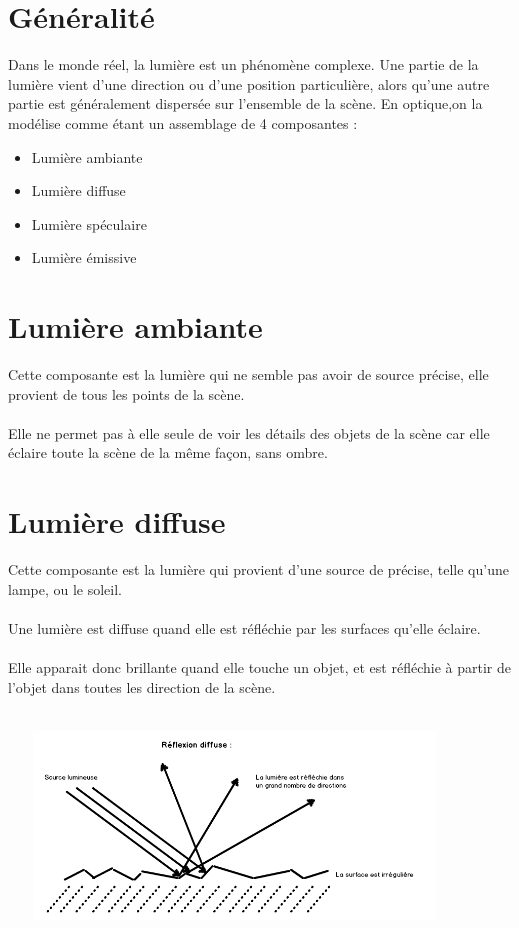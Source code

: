 \section{Généralité}
Dans le monde réel, la lumière est un phénomène complexe.
Une partie de la lumière vient d’une direction ou d’une position particulière, alors
qu’une autre partie est généralement dispersée sur l’ensemble de la scène. En optique,on la modélise comme étant un assemblage de 4 composantes :
\begin{itemize}
\item Lumière ambiante
\item Lumière diffuse
\item Lumière spéculaire
\item Lumière émissive
\end{itemize}

\section{Lumière ambiante}
Cette composante est la lumière qui ne semble pas avoir de source précise, elle provient de tous les points de la scène.
\\\\
Elle ne permet pas à elle seule de voir les détails des objets de la scène car elle éclaire toute la scène de la même façon, sans ombre.

\section{Lumière diffuse}
Cette composante est la lumière qui provient d'une source de précise, telle qu'une lampe, ou le soleil.
\\\\
Une lumière est diffuse quand elle est réfléchie par les surfaces qu'elle éclaire.
\\\\
Elle apparait donc brillante quand elle touche un objet, et est réfléchie à partir de l'objet dans toutes les direction de la scène.
\\\\
\begin{center}
\includegraphics[width=12cm,height=5cm]{pipeline/images/reflexion_diffuse.png}
\end{center}


